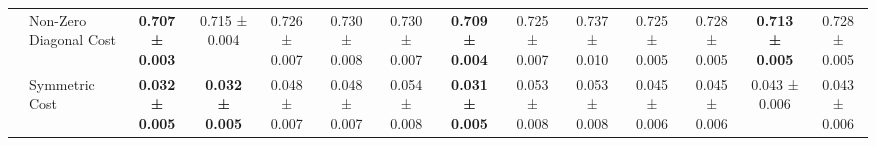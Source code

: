 \begin{table}[H]
{\begin{tabular}{llcccccccccccc}
 & Non-Zero Diagonal Cost & \textbf{0.707 ± 0.003} & 0.715 ± 0.004 & 0.726 ± 0.007 & 0.730 ± 0.008 & 0.730 ± 0.007 & \textbf{0.709 ± 0.004} & 0.725 ± 0.007 & 0.737 ± 0.010 & 0.725 ± 0.005 & 0.728 ± 0.005 & \textbf{0.713 ± 0.005} & 0.728 ± 0.005 \\
 & Symmetric Cost & \textbf{0.032 ± 0.005} & \textbf{0.032 ± 0.005} & 0.048 ± 0.007 & 0.048 ± 0.007 & 0.054 ± 0.008 & \textbf{0.031 ± 0.005} & 0.053 ± 0.008 & 0.053 ± 0.008 & 0.045 ± 0.006 & 0.045 ± 0.006 & 0.043 ± 0.006 & 0.043 ± 0.006 \\
\cline{1-14}
\bottomrule
\end{tabular}
    }
\end{table}
